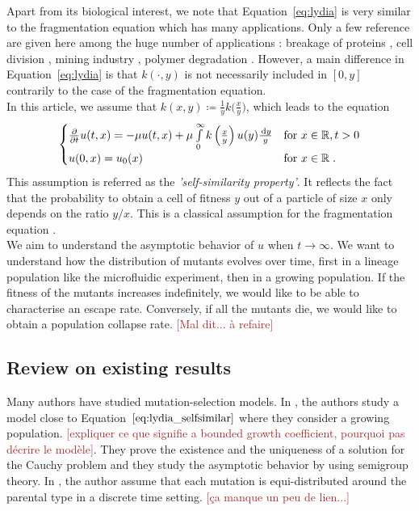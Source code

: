 \documentclass[11pt]{amsart}
\newcommand{\f}{\frac}
\newcommand{\diff}{\,\mathrm{d}}
\newcommand{\ndr}[1]{\textcolor{brown}{[#1]}}
\begin{document}
Apart from its biological interest, we note that Equation~\eqref{eq:lydia} is very similar to the fragmentation equation which has many applications. Only a few reference are given here among the huge number of applications : breakage of proteins \cite{xue2013imaging}, cell division \cite{doumic2013estimating}, mining industry \cite{kolmogorov1941logarithmic, bertoin2005fragmentation}, polymer degradation \cite{montroll1940theory,ziff1985kinetics}. However, a main difference in Equation~\eqref{eq:lydia} is that $k(\cdot, y)$ is not necessarily included in $[0, y]$ contrarily to the case of the fragmentation equation. \\

In this article, we assume that $k(x,y) \coloneqq \f{1}{y}k \big(\frac{x}{y}\big)$, which leads to the equation
\begin{equation}
    \begin{cases}
    \f{\partial}{\partial t} u(t,x) = - \mu u(t,x) + \mu \int\limits_0^\infty k\left(\frac{x}{y}\right) u(y) \f{\diff y}{y} 
    & \text{for } x \in \RR,  t > 0
    \\
    u(0,x) = u_0(x)  & \text{for } x \in \RR \eqfinp
    \label{eq:lydia_selfsimilar}
    \end{cases}
\end{equation}
This assumption is referred as the \textit{'self-similarity property'}. It reflects the fact that the probability to obtain a cell of fitness $y$ out of a particle of size $x$ only depends on the ratio $y/x$. This is a classical assumption for the fragmentation equation \cite{escobedo2005self}. \\
    
We aim to understand the asymptotic behavior of $u$ when $t \to \infty$. We want to understand how the distribution of mutants evolves over time, first in a lineage population like the microfluidic experiment, then in a growing population. If the fitness of the mutants increases indefinitely, we would like to be able to characterise an escape rate. Conversely, if all the mutants die, we would like to obtain a population collapse rate. \ndr{Mal dit... à refaire}
    
\subsection{Review on existing results} \mbox{}

Many authors have studied mutation-selection models. 
In \cite{burger1996stationary}, the authors study a model close to Equation~$\eqref{eq:lydia_selfsimilar}$ where they consider a growing population. \ndr{expliquer ce que signifie a bounded growth coefficient, pourquoi pas décrire le modèle}. They prove the existence and the uniqueness of a solution for the Cauchy problem and they study the asymptotic behavior by using semigroup theory.
In \cite{eshel1972evolution}, the author assume that each mutation is equi-distributed around the parental type in a discrete time setting. \ndr{ça manque un peu de lien...}
\end{document}
